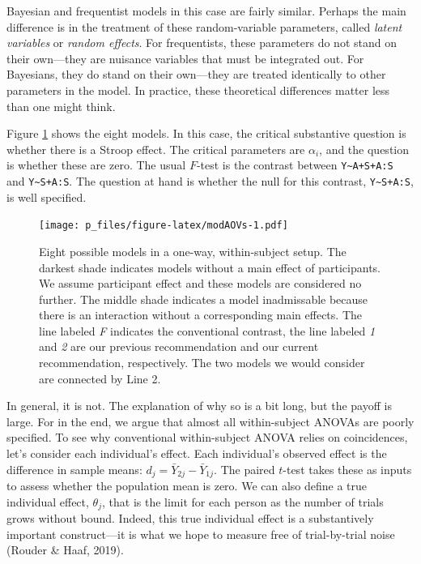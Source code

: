 \documentclass[
  english,
  ,man]{apa6}
\begin{document}
Bayesian and frequentist models in this case are fairly similar. Perhaps the main difference is in the treatment of these random-variable parameters, called \emph{latent variables} or \emph{random effects}. For frequentists, these parameters do not stand on their own---they are nuisance variables that must be integrated out. For Bayesians, they do stand on their own---they are treated identically to other parameters in the model. In practice, these theoretical differences matter less than one might think.

Figure \ref{fig:modAOVs} shows the eight models. In this case, the critical substantive question is whether there is a Stroop effect. The critical parameters are \(\alpha_i\), and the question is whether these are zero. The usual \(F\)-test is the contrast between \texttt{Y\textasciitilde{}A+S+A:S} and \texttt{Y\textasciitilde{}S+A:S}. The question at hand is whether the null for this contrast, \texttt{Y\textasciitilde{}S+A:S}, is well specified.

\begin{figure}
\centering
\texttt{[image: p\_files/figure-latex/modAOVs-1.pdf]}
\caption{\label{fig:modAOVs}Eight possible models in a one-way, within-subject setup. The darkest shade indicates models without a main effect of participants. We assume participant effect and these models are considered no further. The middle shade indicates a model inadmissable because there is an interaction without a corresponding main effects. The line labeled \emph{F} indicates the conventional contrast, the line labeled \emph{1} and \emph{2} are our previous recommendation and our current recommendation, respectively. The two models we would consider are connected by Line 2.}
\end{figure}

In general, it is not. The explanation of why so is a bit long, but the payoff is large. For in the end, we argue that almost all within-subject ANOVAs are poorly specified. To see why conventional within-subject ANOVA relies on coincidences, let's consider each individual's effect. Each individual's observed effect is the difference in sample means: \(d_j=\bar{Y}_{2j}-\bar{Y}_{1j}\). The paired \(t\)-test takes these as inputs to assess whether the population mean is zero. We can also define a true individual effect, \(\theta_j\), that is the limit for each person as the number of trials grows without bound. Indeed, this true individual effect is a substantively important construct---it is what we hope to measure free of trial-by-trial noise (Rouder \& Haaf, 2019).
\end{document}
